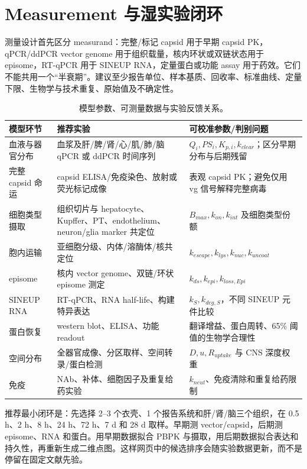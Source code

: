 \documentclass[UTF8,11pt,a4paper]{ctexart}
\begin{document}
\section{Measurement 与湿实验闭环}

测量设计首先区分 measurand：完整/标记 capsid 用于早期 capsid PK，qPCR/ddPCR vector genome 用于组织载量，核内环状或双链状态用于 episome，RT-qPCR 用于 SINEUP RNA，定量蛋白或功能 assay 用于药效。它们不能共用一个“半衰期”。建议至少报告单位、样本基质、回收率、标准曲线、定量下限、生物学与技术重复、原始值及不确定性。

\begin{table}[H]
\centering
\caption{模型参数、可测量数据与实验反馈关系。}
\begin{tabularx}{\textwidth}{p{}p{}X}
\toprule
模型环节 & 推荐实验 & 可校准参数/判别问题 \\
\midrule
血液与器官分布 & 血浆及肝/脾/肾/心/肌/肺/脑 qPCR 或 ddPCR 时间序列 & $Q_i,PS_i,K_{p,i},k_{clear}$；区分早期分布与后期残留 \\
完整 capsid 命运 & capsid ELISA/免疫染色、放射或荧光标记成像 & 表观 capsid PK；避免仅用 vg 信号解释完整病毒 \\
细胞类型摄取 & 组织切片与 hepatocyte、Kupffer、PT、endothelium、neuron/glia marker 共定位 & $B_{max},k_{on},k_{int}$ 及细胞类型份额 \\
胞内运输 & 亚细胞分级、内体/溶酶体/核共定位 & $k_{escape},k_{lys},k_{nuc},k_{uncoat}$ \\
episome & 核内 vector genome、双链/环状 episome 测定 & $k_{ds},k_{epi},k_{loss,Epi}$ \\
SINEUP RNA & RT-qPCR、RNA half-life、构建特异表达 & $k_{S},k_{deg,S}$，不同 SINEUP 元件比较 \\
蛋白恢复 & western blot、ELISA、功能 readout & 翻译增益、蛋白周转、65\% 阈值的生物学合理性 \\
空间分布 & 全器官成像、分区取样、空间转录/蛋白检测 & $D,u,R_{uptake}$ 与 CNS 深度权重 \\
免疫 & NAb、补体、细胞因子及重复给药实验 & $k_{neut}$、免疫清除和重复给药限制 \\
\bottomrule
\end{tabularx}
\end{table}

推荐最小闭环是：先选择 2--3 个衣壳、1 个报告系统和肝/肾/脑三个组织，在 0.5 h、2 h、8 h、24 h、72 h、7 d 和 28 d 取样。早期测 vector/capsid，后期测 episome、RNA 和蛋白。用早期数据拟合 PBPK 与摄取，用后期数据拟合表达和持久性，再重新生成二维点图。这样网页中的候选排序会随实验数据更新，而不是停留在固定文献先验。
\end{document}
